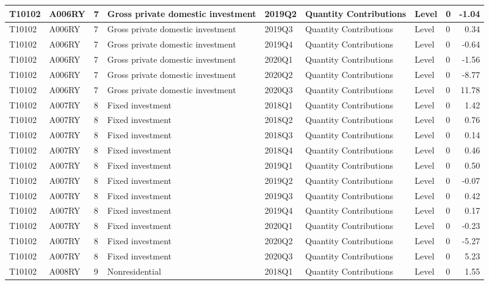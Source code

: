 \documentclass[
]{article}
\begin{document}
\begin{tabular}{l|l|l|l|l|l|l|l|r}
\hline
T10102 & A006RY & 7 & Gross private domestic investment & 2019Q2 & Quantity Contributions & Level & 0 & -1.04\\
\hline
T10102 & A006RY & 7 & Gross private domestic investment & 2019Q3 & Quantity Contributions & Level & 0 & 0.34\\
\hline
T10102 & A006RY & 7 & Gross private domestic investment & 2019Q4 & Quantity Contributions & Level & 0 & -0.64\\
\hline
T10102 & A006RY & 7 & Gross private domestic investment & 2020Q1 & Quantity Contributions & Level & 0 & -1.56\\
\hline
T10102 & A006RY & 7 & Gross private domestic investment & 2020Q2 & Quantity Contributions & Level & 0 & -8.77\\
\hline
T10102 & A006RY & 7 & Gross private domestic investment & 2020Q3 & Quantity Contributions & Level & 0 & 11.78\\
\hline
T10102 & A007RY & 8 & Fixed investment & 2018Q1 & Quantity Contributions & Level & 0 & 1.42\\
\hline
T10102 & A007RY & 8 & Fixed investment & 2018Q2 & Quantity Contributions & Level & 0 & 0.76\\
\hline
T10102 & A007RY & 8 & Fixed investment & 2018Q3 & Quantity Contributions & Level & 0 & 0.14\\
\hline
T10102 & A007RY & 8 & Fixed investment & 2018Q4 & Quantity Contributions & Level & 0 & 0.46\\
\hline
T10102 & A007RY & 8 & Fixed investment & 2019Q1 & Quantity Contributions & Level & 0 & 0.50\\
\hline
T10102 & A007RY & 8 & Fixed investment & 2019Q2 & Quantity Contributions & Level & 0 & -0.07\\
\hline
T10102 & A007RY & 8 & Fixed investment & 2019Q3 & Quantity Contributions & Level & 0 & 0.42\\
\hline
T10102 & A007RY & 8 & Fixed investment & 2019Q4 & Quantity Contributions & Level & 0 & 0.17\\
\hline
T10102 & A007RY & 8 & Fixed investment & 2020Q1 & Quantity Contributions & Level & 0 & -0.23\\
\hline
T10102 & A007RY & 8 & Fixed investment & 2020Q2 & Quantity Contributions & Level & 0 & -5.27\\
\hline
T10102 & A007RY & 8 & Fixed investment & 2020Q3 & Quantity Contributions & Level & 0 & 5.23\\
\hline
T10102 & A008RY & 9 & Nonresidential & 2018Q1 & Quantity Contributions & Level & 0 & 1.55\\

\end{tabular}
\end{document}
